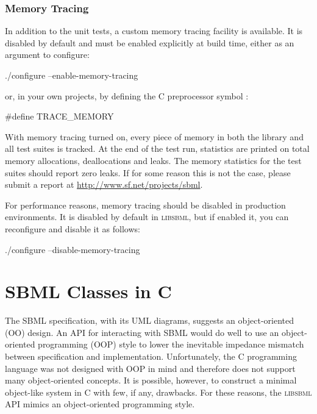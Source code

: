 \documentclass{sbmlmanual}
\newcommand{\libsbml}{\textsc{libsbml}}
\begin{document}
\subsubsection{Memory Tracing}

In addition to the unit tests, a custom memory tracing facility is
available.  It is disabled by default and must be enabled explicitly
at build time, either as an argument to configure:

\begin{example}[csh]
  ./configure --enable-memory-tracing
\end{example}

or, in your own projects, by defining the C preprocessor symbol
:

\begin{example}[c]
  #define TRACE_MEMORY
\end{example}

With memory tracing turned on, every piece of memory in both the library
and all test suites is tracked.  At the end of the test run, statistics are
printed on total memory allocations, deallocations and leaks.  The memory
statistics for the test suites should report zero leaks.  If for some
reason this is not the case, please submit a report at
\url{http://www.sf.net/projects/sbml}.

For performance reasons, memory tracing should be disabled in production
environments.  It is disabled by default in \libsbml{}, but if enabled it,
you can reconfigure and disable it as follows:

\begin{example}[csh]
  ./configure --disable-memory-tracing
\end{example}




\section{SBML Classes in C}
\label{sec:sbml-classes-in-c}

The SBML specification, with its UML diagrams, suggests an object-oriented
(OO) design.  An API for interacting with SBML would do well to use an
object-oriented programming (OOP) style to lower the inevitable impedance
mismatch between specification and implementation.  Unfortunately, the C
programming language was not designed with OOP in mind and therefore does
not support many object-oriented concepts.  It is possible, however, to
construct a minimal object-like system in C with few, if any, drawbacks.
For these reasons, the \libsbml{} API mimics an object-oriented programming
style.
\end{document}
